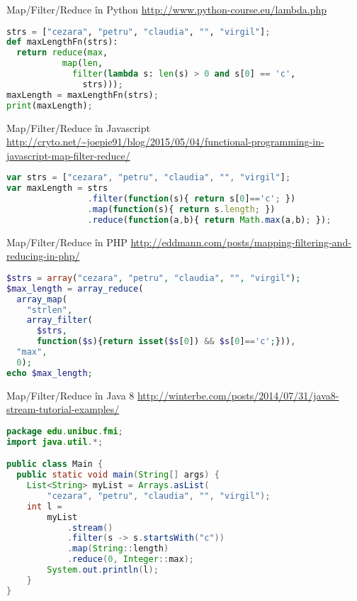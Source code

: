 \documentclass[xcolor=pdftex,romanian,colorlinks]{beamer}
\begin{document}
\begin{frame}[fragile]{Map/Filter/Reduce în Python}
{\url{http://www.python-course.eu/lambda.php}}
\begin{lstlisting}[language=Python,basicstyle=\small]
strs = ["cezara", "petru", "claudia", "", "virgil"];
def maxLengthFn(strs): 
  return reduce(max, 
           map(len, 
             filter(lambda s: len(s) > 0 and s[0] == 'c', 
               strs)));
maxLength = maxLengthFn(strs);
print(maxLength);
\end{lstlisting}
\end{frame}

\begin{frame}[fragile]{Map/Filter/Reduce în Javascript}
{\url{http://cryto.net/~joepie91/blog/2015/05/04/functional-programming-in-javascript-map-filter-reduce/}}
\begin{lstlisting}[language=JavaScript,basicstyle=\small]
var strs = ["cezara", "petru", "claudia", "", "virgil"];
var maxLength = strs
                .filter(function(s){ return s[0]=='c'; })
                .map(function(s){ return s.length; })
                .reduce(function(a,b){ return Math.max(a,b); });
\end{lstlisting}
\end{frame}


\begin{frame}[fragile]{Map/Filter/Reduce în PHP}
{\url{http://eddmann.com/posts/mapping-filtering-and-reducing-in-php/}}
\begin{lstlisting}[language=PHP,basicstyle=\small,morekeywords={array_reduce}]
$strs = array("cezara", "petru", "claudia", "", "virgil");
$max_length = array_reduce(
  array_map(
    "strlen",
    array_filter(
      $strs,
      function($s){return isset($s[0]) && $s[0]=='c';})),
  "max", 
  0);
echo $max_length;
\end{lstlisting}
\end{frame}


\begin{frame}[fragile]{Map/Filter/Reduce în Java 8}
{\url{http://winterbe.com/posts/2014/07/31/java8-stream-tutorial-examples/}}
\begin{lstlisting}[language=Java,basicstyle=\small]
package edu.unibuc.fmi;
import java.util.*;

public class Main {
  public static void main(String[] args) {
    List<String> myList = Arrays.asList(
        "cezara", "petru", "claudia", "", "virgil");
    int l =
        myList
            .stream()
            .filter(s -> s.startsWith("c"))
            .map(String::length)
            .reduce(0, Integer::max);
        System.out.println(l);
    }
}
\end{lstlisting}
\end{frame}
\end{document}
